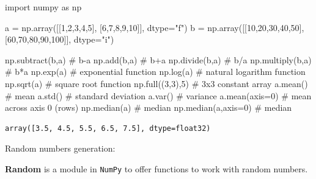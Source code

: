 \documentclass[
  letterpaper,
  DIV=11,
  numbers=noendperiod]{scrreprt}
\newenvironment{Shaded}{\begin{snugshade}}{\end{snugshade}}
\newcommand{\CommentTok}[1]{\textcolor[rgb]{0.37,0.37,0.37}{#1}}
\newcommand{\DecValTok}[1]{\textcolor[rgb]{0.68,0.00,0.00}{#1}}
\newcommand{\ImportTok}[1]{\textcolor[rgb]{0.00,0.46,0.62}{#1}}
\newcommand{\NormalTok}[1]{\textcolor[rgb]{0.00,0.23,0.31}{#1}}
\newcommand{\OperatorTok}[1]{\textcolor[rgb]{0.37,0.37,0.37}{#1}}
\newcommand{\StringTok}[1]{\textcolor[rgb]{0.13,0.47,0.30}{#1}}
\begin{document}
\begin{Shaded}
\begin{Highlighting}[]
\ImportTok{import}\NormalTok{ numpy }\ImportTok{as}\NormalTok{ np}

\NormalTok{a }\OperatorTok{=}\NormalTok{ np.array([[}\DecValTok{1}\NormalTok{,}\DecValTok{2}\NormalTok{,}\DecValTok{3}\NormalTok{,}\DecValTok{4}\NormalTok{,}\DecValTok{5}\NormalTok{], [}\DecValTok{6}\NormalTok{,}\DecValTok{7}\NormalTok{,}\DecValTok{8}\NormalTok{,}\DecValTok{9}\NormalTok{,}\DecValTok{10}\NormalTok{]], dtype}\OperatorTok{=}\StringTok{"f"}\NormalTok{)}
\NormalTok{b }\OperatorTok{=}\NormalTok{ np.array([[}\DecValTok{10}\NormalTok{,}\DecValTok{20}\NormalTok{,}\DecValTok{30}\NormalTok{,}\DecValTok{40}\NormalTok{,}\DecValTok{50}\NormalTok{], [}\DecValTok{60}\NormalTok{,}\DecValTok{70}\NormalTok{,}\DecValTok{80}\NormalTok{,}\DecValTok{90}\NormalTok{,}\DecValTok{100}\NormalTok{]], dtype}\OperatorTok{=}\StringTok{"i"}\NormalTok{)}

\NormalTok{np.subtract(b,a) }\CommentTok{\# b{-}a}
\NormalTok{np.add(b,a) }\CommentTok{\# b+a}
\NormalTok{np.divide(b,a) }\CommentTok{\# b/a}
\NormalTok{np.multiply(b,a) }\CommentTok{\# b*a}
\NormalTok{np.exp(a) }\CommentTok{\# exponential function}
\NormalTok{np.log(a) }\CommentTok{\# natural logarithm function}
\NormalTok{np.sqrt(a) }\CommentTok{\# square root function}
\NormalTok{np.full((}\DecValTok{3}\NormalTok{,}\DecValTok{3}\NormalTok{),}\DecValTok{5}\NormalTok{) }\CommentTok{\# 3x3 constant array}
\NormalTok{a.mean() }\CommentTok{\# mean }
\NormalTok{a.std() }\CommentTok{\# standard deviation}
\NormalTok{a.var() }\CommentTok{\# variance}
\NormalTok{a.mean(axis}\OperatorTok{=}\DecValTok{0}\NormalTok{) }\CommentTok{\# mean across axis 0 (rows)}
\NormalTok{np.median(a) }\CommentTok{\# median }
\NormalTok{np.median(a,axis}\OperatorTok{=}\DecValTok{0}\NormalTok{) }\CommentTok{\# median }
\end{Highlighting}
\end{Shaded}

\begin{verbatim}
array([3.5, 4.5, 5.5, 6.5, 7.5], dtype=float32)
\end{verbatim}

Random numbers generation:

\textbf{Random} is a module in \texttt{NumPy} to offer functions to work
with random numbers.
\end{document}
